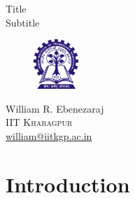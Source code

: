 \documentclass[a4paper,12pt]{report}
\begin{document}
\begin{titlepage}


\vspace*{\fill}
\centering 
\Huge Title
\vspace{12pt}\\
\small Subtitle
\vspace*{\fill}\\
\begin{figure}[H]
	\centering
	\includegraphics[width=0.15\textwidth]{images/logo.png}
\end{figure}
\Large William R. Ebenezaraj
\vspace{2pt}\\
\small \textsc{IIT Kharagpur}\\
\href{mailto:william@iitkgp.ac.in}{william@iitkgp.ac.in}
\vspace*{0pt}
\end{titlepage}

\newpage

\tableofcontents

\newpage

\section{Introduction}
\end{document}
